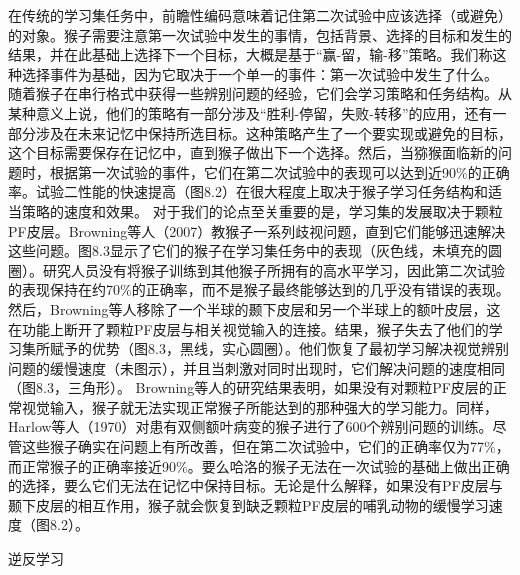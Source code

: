 在传统的学习集任务中，前瞻性编码意味着记住第二次试验中应该选择（或避免）的对象。猴子需要注意第一次试验中发生的事情，包括背景、选择的目标和发生的结果，并在此基础上选择下一个目标，大概是基于“赢-留，输-移”策略。我们称这种选择事件为基础，因为它取决于一个单一的事件：第一次试验中发生了什么。
随着猴子在串行格式中获得一些辨别问题的经验，它们会学习策略和任务结构。从某种意义上说，他们的策略有一部分涉及“胜利-停留，失败-转移”的应用，还有一部分涉及在未来记忆中保持所选目标。这种策略产生了一个要实现或避免的目标，这个目标需要保存在记忆中，直到猴子做出下一个选择。然后，当猕猴面临新的问题时，根据第一次试验的事件，它们在第二次试验中的表现可以达到近90$\%$的正确率。试验二性能的快速提高（图8.2）在很大程度上取决于猴子学习任务结构和适当策略的速度和效果。
对于我们的论点至关重要的是，学习集的发展取决于颗粒PF皮层。Browning等人（2007）教猴子一系列歧视问题，直到它们能够迅速解决这些问题。图8.3显示了它们的猴子在学习集任务中的表现（灰色线，未填充的圆圈）。研究人员没有将猴子训练到其他猴子所拥有的高水平学习，因此第二次试验的表现保持在约70$\%$的正确率，而不是猴子最终能够达到的几乎没有错误的表现。
然后，Browning等人移除了一个半球的颞下皮层和另一个半球上的额叶皮层，这在功能上断开了颗粒PF皮层与相关视觉输入的连接。结果，猴子失去了他们的学习集所赋予的优势（图8.3，黑线，实心圆圈）。他们恢复了最初学习解决视觉辨别问题的缓慢速度（未图示），并且当刺激对同时出现时，它们解决问题的速度相同（图8.3，三角形）。
Browning等人的研究结果表明，如果没有对颗粒PF皮层的正常视觉输入，猴子就无法实现正常猴子所能达到的那种强大的学习能力。同样，Harlow等人（1970）对患有双侧额叶病变的猴子进行了600个辨别问题的训练。尽管这些猴子确实在问题上有所改善，但在第二次试验中，它们的正确率仅为77$\%$，而正常猴子的正确率接近90$\%$。要么哈洛的猴子无法在一次试验的基础上做出正确的选择，要么它们无法在记忆中保持目标。无论是什么解释，如果没有PF皮层与颞下皮层的相互作用，猴子就会恢复到缺乏颗粒PF皮层的哺乳动物的缓慢学习速度（图8.2）。

逆反学习

